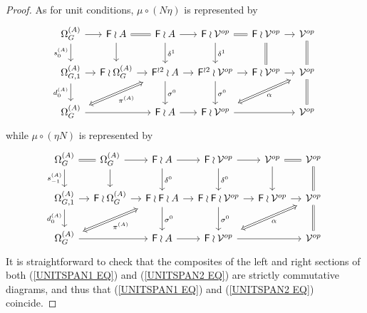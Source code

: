 \documentclass[a4paper,10pt]{article}%
\begin{document}
\begin{proof}
As for unit conditions, $\mu \circ (N \eta)$ is represented by
\begin{equation}\label{UNITSPAN1 EQ}
	\begin{tikzcd}[column sep=1.05em]
	\Omega_G^{(A)} \ar{d}[swap]{s_{0}^{(A)}} \ar{r} &
	\Fin \wr A \ar{d} \ar[equal]{r} &
	\Fin \wr A \ar{d}{\delta^1} \ar{r} &
	\Fin \wr \mathcal{V}^{op} \ar{d}{\delta^1} \ar[equal]{r} &
	\Fin \wr \mathcal{V}^{op} \ar[equal]{d} \ar{r} &
	\mathcal{V}^{op} \ar[equal]{d}
\\
	\Omega_{G,1}^{(A)} \ar{r} \ar{d}[swap]{d_{0}^{(A)}}&
	\Fin \wr \Omega_{G}^{(A)} \ar{r} &
	|[alias=FFOmega]|\Fin^{\wr 2} \wr A \ar{d}{\sigma^0} \ar{r} &
	\Fin^{\wr 2} \wr \mathcal{V}^{op} \ar{d}{\sigma^0} \ar{r} &
	\Fin \wr \mathcal{V}^{op} \ar{r} &
	|[alias=dog]|
	\mathcal{V}^{op} \ar[equal]{d}
\\
	|[alias=Omega]|\Omega_{G}^{(A)} \ar{rr}&&
	\Fin \wr A \ar{r} &
	|[alias=cat]|
	\Fin \wr \mathcal{V}^{op} \ar{rr} &&
	\mathcal{V}^{op}
	\arrow[Leftrightarrow, from=FFOmega, to=Omega,shorten <=0.15cm,,shorten >=0.15cm,"\pi^{(A)}"]
	\arrow[Leftrightarrow, from=dog, to=cat,shorten <=0.15cm,,shorten >=0.15cm,"\alpha"]
	\end{tikzcd}
\end{equation}
while $\mu \circ (\eta N)$ is represented by 
\begin{equation}\label{UNITSPAN2 EQ}
	\begin{tikzcd}[column sep=1.05em]
	\Omega^{(A)}_G \ar{d}[swap]{s_{-1}^{(A)}} \ar[equal]{r} &
	\Omega^{(A)}_G \ar{d} \ar{r} &
	\Fin \wr A \ar{d}{\delta^0} \ar{r} &
	\Fin \wr \mathcal{V}^{op} \ar{d}{\delta^0} \ar{r} &
	\mathcal{V}^{op} \ar{d} \ar[equal]{r} &
	\mathcal{V}^{op} \ar[equal]{d}
\\
	\Omega_{G,1}^{(A)} \ar{r} \ar{d}[swap]{d_{0}^{(A)}}&
	\Fin \wr \Omega_{G}^{(A)} \ar{r} &
	|[alias=FFOmega]|\Fin \wr \Fin \wr A \ar{d}{\sigma^0} \ar{r} &
	\Fin \wr \Fin \wr \mathcal{V}^{op} \ar{d}{\sigma^0} \ar{r} &
	\Fin \wr \mathcal{V}^{op} \ar{r} &
	|[alias=dog]|
	\mathcal{V}^{op} \ar[equal]{d}
\\
	|[alias=Omega]|\Omega_{G}^{(A)} \ar{rr} &&
	\Fin \wr A \ar{r} &
	|[alias=cat]|
	\Fin \wr \mathcal{V}^{op} \ar{rr} &&
	\mathcal{V}^{op}
	\arrow[Leftrightarrow, from=FFOmega, to=Omega,shorten <=0.15cm,,shorten >=0.15cm,"\pi^{(A)}"]
	\arrow[Leftrightarrow, from=dog, to=cat,shorten <=0.15cm,,shorten >=0.15cm,"\alpha"]
	\end{tikzcd}
\end{equation}
It is straightforward to check that the composites of the left and right sections of both (\ref{UNITSPAN1 EQ}) and (\ref{UNITSPAN2 EQ}) are strictly commutative diagrams, and thus that 
(\ref{UNITSPAN1 EQ}) and (\ref{UNITSPAN2 EQ}) coincide.
\end{proof}
\end{document}
